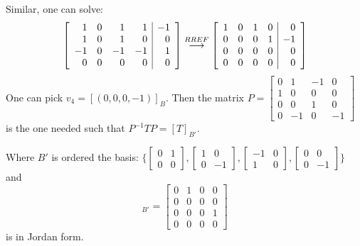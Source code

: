 \documentclass{article}
\newcommand{\grstep}[2][\relax]{%
   \ensuremath{\mathrel{
       {\mathop{\longrightarrow}\limits^{#2\mathstrut}_{
                                     \begin{subarray}{l} #1 \end{subarray}}}}}}
\begin{document}
\begin{enumerate}[label=(\alph*)]
    Similar, one can solve:
    \begin{equation*}
        \left[\begin{array}{rrrr|r}
    1 & 0 & 1 & 1 & -1 \\
    1 & 0 & 1 & 0 & 0 \\
    -1 & 0 & -1 & -1 & 1 \\
    0 & 0 & 0 & 0 & 0
    \end{array}\right] \grstep[]{RREF} \left[\begin{array}{rrrr|r}
    1 & 0 & 1 & 0 & 0 \\
    0 & 0 & 0 & 1 & -1 \\
    0 & 0 & 0 & 0 & 0 \\
    0 & 0 & 0 & 0 & 0
    \end{array}\right]
    \end{equation*}
    One can pick $v_4=[(0,0,0,-1)]_B$. Then the matrix $P=\left[\begin{array}{rrrr}
    0 & 1 & -1 & 0 \\
    1 & 0 & 0 & 0 \\
    0 & 0 & 1 & 0 \\
    0 & -1 & 0 & -1
    \end{array}\right]$ is the one needed such that $P^{-1}TP=[T]_{B'}$.
    
    Where $B'$ is ordered the basis:
    $\Bigg\{\left[\begin{array}{rr}
    0 & 1 \\
    0 & 0
    \end{array}\right], \left[\begin{array}{rr}
    1 & 0 \\
    0 & -1
    \end{array}\right],
    \left[\begin{array}{rr}
    -1 & 0 \\
    1 & 0
    \end{array}\right],
    \left[\begin{array}{rr}
    0 & 0 \\
    0 & -1
    \end{array}\right]
    \Bigg\}$
    and 
    \begin{equation*}
    [T]_{B'}=\left[\begin{array}{rrrr}
    0 & 1 & 0 & 0 \\
    0 & 0 & 0 & 0 \\
    0 & 0 & 0 & 1 \\
    0 & 0 & 0 & 0
    \end{array}\right]
    \end{equation*}
    is in Jordan form.
\end{enumerate}
\end{document}
